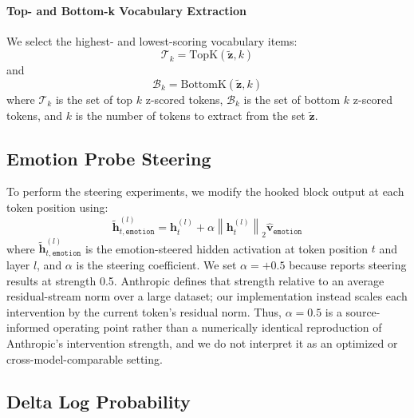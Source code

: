 \paragraph{Top- and Bottom-k Vocabulary Extraction} We select the highest- and lowest-scoring vocabulary items:
\begin{equation}
    \mathcal{T}_k=\text{TopK}(\tilde{\mathbf{z}}, k)
    \label{eqtn:topk-vocabs}
\end{equation}
and
\begin{equation}
    \mathcal{B}_k=\text{BottomK}(\tilde{\mathbf{z}}, k)
    \label{eqtn:bottomk-vocabs}
\end{equation}
where $\mathcal{T}_k$ is the set of top $k$ z-scored tokens, $\mathcal{B}_k$ is the set of 
bottom $k$ z-scored tokens, and $k$ is the number of tokens to extract from the set 
$\tilde{\mathbf{z}}$.

\subsection{Emotion Probe Steering}

To perform the steering experiments, we modify the hooked block output at each token position using:
\begin{equation}
    \tilde{\mathbf{h}}_{t,\mathtt{emotion}}^{(l)}=\mathbf{h}_{t}^{(l)}+\alpha\left\lVert\mathbf{h}_{t}^{(l)}\right\rVert_2\mathbf{\hat{v}}_{\mathtt{emotion}}
    \label{eqtn:emotion-steering}
\end{equation}
where $\tilde{\mathbf{h}}_{t,\mathtt{emotion}}^{(l)}$ is the emotion-steered hidden activation at token position $t$ and layer $l$, 
and $\alpha$ is the steering coefficient. We set $\alpha=+0.5$ because \cite{sofroniew_emotion_2026} reports steering results at 
strength 0.5. Anthropic defines that strength relative to an average residual-stream norm over a large dataset; our implementation 
instead scales each intervention by the current token's residual norm. Thus, $\alpha=0.5$ is a source-informed operating point rather 
than a numerically identical reproduction of Anthropic's intervention strength, and we do not interpret it as an optimized or 
cross-model-comparable setting.

\subsection{Delta Log Probability}

